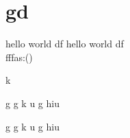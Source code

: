 \documentclass{article}
\begin{document}
\section{gd}
	hello world df \textbf{\gitRel}
	hello world df \textbf{\gitRel}\\
	fffas:\gitRoff(\gitCommitterDate)\\
	\newpage
	\begin{changelog}[author=Michele]
		\begin{version}[version=1.20]
			\added
			\item k
		\end{version}
		\begin{version}[version=\gitReln]
		\added
		\item  g g k u g  hiu 
	\end{version}
		\begin{version}[version=\gitReln]
	\added
	\item  g g k u g  hiu 
\end{version}
	\end{changelog}
\end{document}
